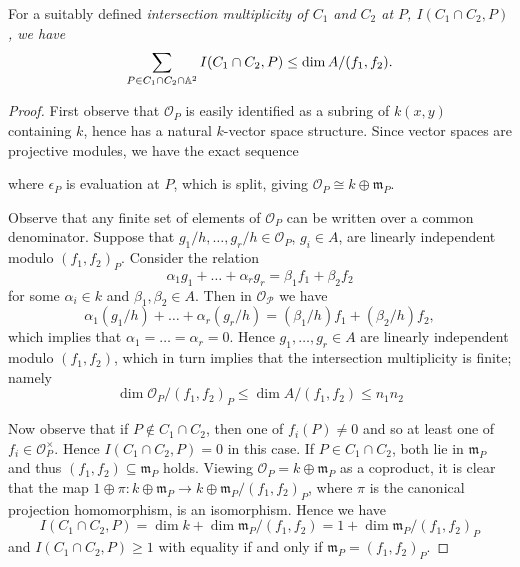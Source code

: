 \documentclass[10pt]{amsart}
\begin{document}
\begin{prop}\label{prop3}
	For a suitably defined \it{intersection multiplicity} of $C_1$ and $C_2$ at $P$, $I(C_1 \cap C_2, P)$, we have
		$$\sum_{P \in C_1 \cap C_2 \cap \mathbb{A}^2} I(C_1 \cap C_2, P) \leq \dim A / (f_1, f_2).$$

	\begin{proof}
		First observe that $\mathcal{O}_P$ is easily identified as a subring of $k(x,y)$ containing $k$, hence has a natural $k$-vector space structure.
		Since vector spaces are projective modules, we have the exact sequence
		\begin{center}
		\end{center}
		where $\epsilon_P$ is evaluation at $P$, which is split, giving $\mathcal{O}_P \cong k \oplus \mathfrak{m}_P$.
		
		Observe that any finite set of elements of $\mathcal{O}_P$ can be written over a common denominator.
		Suppose that $g_1/h, \ldots, g_r/h \in \mathcal{O}_P$, $g_i \in A$, are linearly independent modulo $(f_1, f_2)_P$.
		Consider the relation
			$$\alpha_1g_1 + \ldots + \alpha_rg_r = \beta_1 f_1 + \beta_2 f_2$$
		for some $\alpha_i \in k$ and $\beta_1, \beta_2 \in A.$
		Then in $\mathcal{O_P}$ we have
			$$\alpha_1(g_1/h) + \ldots + \alpha_r(g_r/h) = (\beta_1/h)f_1 + (\beta_2/h) f_2,$$
		which implies that $\alpha_1 = \ldots = \alpha_r = 0$.
		Hence $g_1, \ldots, g_r \in A$ are linearly independent modulo $(f_1, f_2)$, which in turn implies that the intersection multiplicity is finite; namely
			$$\dim \mathcal{O}_P/(f_1, f_2)_P \leq \dim A/(f_1, f_2) \leq n_1n_2$$
		

		Now observe that if $P \not \in C_1 \cap C_2$, then one of $f_i(P) \neq 0$ and so at least one of $f_i \in \mathcal{O}_P^\times$.
		Hence $I(C_1 \cap C_2, P) = 0$ in this case.
		If $P \in C_1 \cap C_2$, both lie in $\mathfrak{m}_P$ and thus $(f_1, f_2) \subseteq \mathfrak{m}_P$ holds.
		Viewing $\mathcal{O}_P = k \oplus \mathfrak{m}_P$ as a coproduct, it is clear that the map $1 \oplus \pi \colon k \oplus \mathfrak{m}_P \rightarrow k \oplus \mathfrak{m}_P/(f_1,f_2)_P$, where $\pi$ is the canonical projection homomorphism, is an isomorphism.
		Hence we have
			$$I(C_1 \cap C_2, P) = \dim{k} + \dim{\mathfrak{m}_P/(f_1, f_2)} = 1 + \dim{\mathfrak{m}_P/(f_1, f_2)_P}$$
		and $I(C_1 \cap C_2, P) \geq 1$ with equality if and only if $\mathfrak{m}_P = (f_1, f_2)_P$.
	

\end{proof}
\end{prop}
\end{document}
